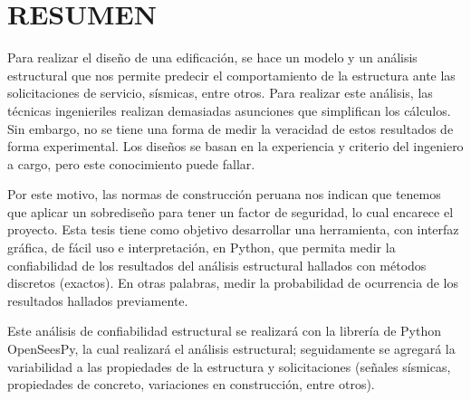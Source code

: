 \chapter*{\centering \large RESUMEN} 
\onehalfspacing
\setlength{\parskip}{1em} %

{
Para realizar el diseño de una edificación, se hace un modelo y un análisis estructural que nos permite predecir el comportamiento de la estructura ante las solicitaciones de servicio, sísmicas, entre otros. Para realizar este análisis, las técnicas ingenieriles realizan demasiadas asunciones que simplifican los cálculos. Sin embargo, no se tiene una forma de medir la veracidad de estos resultados de forma experimental. Los diseños se basan en la experiencia y criterio del ingeniero a cargo, pero este conocimiento puede fallar.

Por este motivo, las normas de construcción peruana nos indican que tenemos que aplicar un sobrediseño para tener un factor de seguridad, lo cual encarece el proyecto. Esta tesis tiene como objetivo desarrollar una herramienta, con interfaz gráfica, de fácil uso e interpretación, en Python, que permita medir la confiabilidad de los resultados del análisis estructural hallados con métodos discretos (exactos). En otras palabras, medir la probabilidad de ocurrencia de los resultados hallados previamente.

Este análisis de confiabilidad estructural se realizará con la librería de Python OpenSeesPy, la cual realizará el análisis estructural; seguidamente se agregará la variabilidad a las propiedades de la estructura y solicitaciones (señales sísmicas, propiedades de concreto, variaciones en construcción, entre otros).
}
